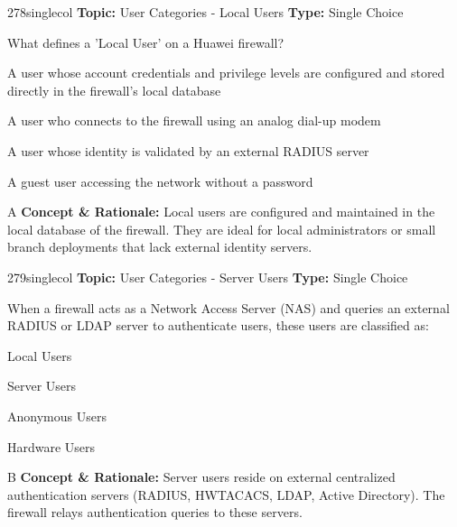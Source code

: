 \begin{qcard}{278}{singlecol}
\textcolor{darkslate!75}{\small\textbf{Topic:} User Categories - Local Users \hfill \textbf{Type:} Single Choice}\vspace{0.4em}\par
What defines a 'Local User' on a Huawei firewall?
\begin{qoptions}
\item A user whose account credentials and privilege levels are configured and stored directly in the firewall's local database
\item A user who connects to the firewall using an analog dial-up modem
\item A user whose identity is validated by an external RADIUS server
\item A guest user accessing the network without a password
\end{qoptions}
\end{qcard}
\nopagebreak
\begin{explainbox}{A}
\textbf{Concept \& Rationale:} Local users are configured and maintained in the local database of the firewall. They are ideal for local administrators or small branch deployments that lack external identity servers.
\end{explainbox}

\begin{qcard}{279}{singlecol}
\textcolor{darkslate!75}{\small\textbf{Topic:} User Categories - Server Users \hfill \textbf{Type:} Single Choice}\vspace{0.4em}\par
When a firewall acts as a Network Access Server (NAS) and queries an external RADIUS or LDAP server to authenticate users, these users are classified as:
\begin{qoptions}
\item Local Users
\item Server Users
\item Anonymous Users
\item Hardware Users
\end{qoptions}
\end{qcard}
\nopagebreak
\begin{explainbox}{B}
\textbf{Concept \& Rationale:} Server users reside on external centralized authentication servers (RADIUS, HWTACACS, LDAP, Active Directory). The firewall relays authentication queries to these servers.
\end{explainbox}

